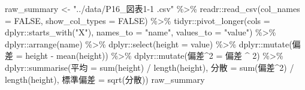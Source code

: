 \documentclass[
  12pt,
]{book}
\newenvironment{Shaded}{\begin{snugshade}}{\end{snugshade}}
\newcommand{\AttributeTok}[1]{\textcolor[rgb]{0.77,0.63,0.00}{#1}}
\newcommand{\ConstantTok}[1]{\textcolor[rgb]{0.00,0.00,0.00}{#1}}
\newcommand{\DecValTok}[1]{\textcolor[rgb]{0.00,0.00,0.81}{#1}}
\newcommand{\FunctionTok}[1]{\textcolor[rgb]{0.00,0.00,0.00}{#1}}
\newcommand{\NormalTok}[1]{#1}
\newcommand{\OtherTok}[1]{\textcolor[rgb]{0.56,0.35,0.01}{#1}}
\newcommand{\SpecialCharTok}[1]{\textcolor[rgb]{0.00,0.00,0.00}{#1}}
\newcommand{\StringTok}[1]{\textcolor[rgb]{0.31,0.60,0.02}{#1}}
\begin{document}
\begin{Shaded}
\begin{Highlighting}[]
\NormalTok{raw\_summary }\OtherTok{\textless{}{-}} \StringTok{"../data/P16\_図表1{-}1 .csv"} \SpecialCharTok{\%\textgreater{}\%} 
\NormalTok{  readr}\SpecialCharTok{::}\FunctionTok{read\_csv}\NormalTok{(}\AttributeTok{col\_names =} \ConstantTok{FALSE}\NormalTok{, }\AttributeTok{show\_col\_types =} \ConstantTok{FALSE}\NormalTok{) }\SpecialCharTok{\%\textgreater{}\%} 
\NormalTok{  tidyr}\SpecialCharTok{::}\FunctionTok{pivot\_longer}\NormalTok{(}\AttributeTok{cols =}\NormalTok{ dplyr}\SpecialCharTok{::}\FunctionTok{starts\_with}\NormalTok{(}\StringTok{"X"}\NormalTok{),}
                      \AttributeTok{names\_to =} \StringTok{"name"}\NormalTok{, }\AttributeTok{values\_to =} \StringTok{"value"}\NormalTok{) }\SpecialCharTok{\%\textgreater{}\%} 
\NormalTok{  dplyr}\SpecialCharTok{::}\FunctionTok{arrange}\NormalTok{(name) }\SpecialCharTok{\%\textgreater{}\%} 
\NormalTok{  dplyr}\SpecialCharTok{::}\FunctionTok{select}\NormalTok{(}\AttributeTok{height =}\NormalTok{ value) }\SpecialCharTok{\%\textgreater{}\%} 
\NormalTok{  dplyr}\SpecialCharTok{::}\FunctionTok{mutate}\NormalTok{(}\StringTok{\textasciigrave{}}\AttributeTok{偏差}\StringTok{\textasciigrave{}} \OtherTok{=}\NormalTok{ height }\SpecialCharTok{{-}} \FunctionTok{mean}\NormalTok{(height)) }\SpecialCharTok{\%\textgreater{}\%} 
\NormalTok{  dplyr}\SpecialCharTok{::}\FunctionTok{mutate}\NormalTok{(}\StringTok{\textasciigrave{}}\AttributeTok{偏差\^{}2}\StringTok{\textasciigrave{}} \OtherTok{=} \StringTok{\textasciigrave{}}\AttributeTok{偏差}\StringTok{\textasciigrave{}} \SpecialCharTok{\^{}} \DecValTok{2}\NormalTok{) }\SpecialCharTok{\%\textgreater{}\%} 
\NormalTok{  dplyr}\SpecialCharTok{::}\FunctionTok{summarise}\NormalTok{(}\StringTok{\textasciigrave{}}\AttributeTok{平均}\StringTok{\textasciigrave{}} \OtherTok{=} \FunctionTok{sum}\NormalTok{(height) }\SpecialCharTok{/} \FunctionTok{length}\NormalTok{(height),}
                   \StringTok{\textasciigrave{}}\AttributeTok{分散}\StringTok{\textasciigrave{}} \OtherTok{=} \FunctionTok{sum}\NormalTok{(}\StringTok{\textasciigrave{}}\AttributeTok{偏差\^{}2}\StringTok{\textasciigrave{}}\NormalTok{) }\SpecialCharTok{/} \FunctionTok{length}\NormalTok{(height),}
                   \StringTok{\textasciigrave{}}\AttributeTok{標準偏差}\StringTok{\textasciigrave{}} \OtherTok{=} \FunctionTok{sqrt}\NormalTok{(}\StringTok{\textasciigrave{}}\AttributeTok{分散}\StringTok{\textasciigrave{}}\NormalTok{))}
\NormalTok{raw\_summary}
\end{Highlighting}
\end{Shaded}
\end{document}
